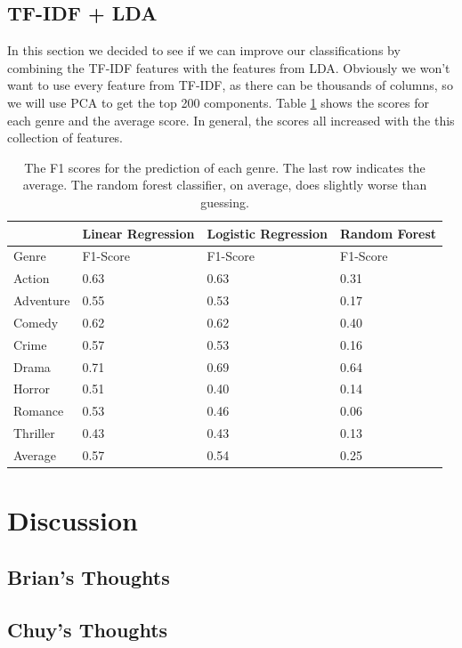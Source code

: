 \documentclass[11pt]{article}
\begin{document}
\subsection{TF-IDF + LDA}
\label{sec:tfidf_lda}

In this section we decided to see if we can improve our classifications by combining the TF-IDF features with the features from LDA. Obviously we won't want to use every feature from TF-IDF, as there can be thousands of columns, so we will use PCA to get the top 200 components. Table \ref{tab:lda_tfidf_scores} shows the scores for each genre and the average score. In general, the scores all increased with the this collection of features. 

\begin{table}[h]
	\label{tab:lda_tfidf_scores}
\begin{center}
	\begin{tabular}{| l | l | l | l |}
		\hline
		           & Linear Regression & Logistic Regression & Random Forest \\
		\hline
		Genre      & F1-Score          & F1-Score            & F1-Score       \\
	  	\hline			
	  	Action     & 0.63              & 0.63                & 0.31 \\
	  	Adventure  & 0.55              & 0.53                & 0.17 \\ 
	  	Comedy     & 0.62              & 0.62                & 0.40 \\
	  	Crime      & 0.57              & 0.53                & 0.16 \\
	  	Drama      & 0.71              & 0.69                & 0.64 \\
	  	Horror     & 0.51              & 0.40                & 0.14 \\
	  	Romance    & 0.53              & 0.46                & 0.06 \\
	  	Thriller   & 0.43              & 0.43                & 0.13 \\
	  	\hline
	  	Average    & 0.57              & 0.54                & 0.25 \\
	  \hline  
	\end{tabular}
\end{center}
	\caption{The F1 scores for the prediction of each genre. The last row indicates the average. The random forest classifier, on average, does slightly worse than guessing.}
\end{table}

\section{Discussion}
\label{sec:discussion}

\subsection{Brian's Thoughts}

\subsection{Chuy's Thoughts}

{}

\end{document}
